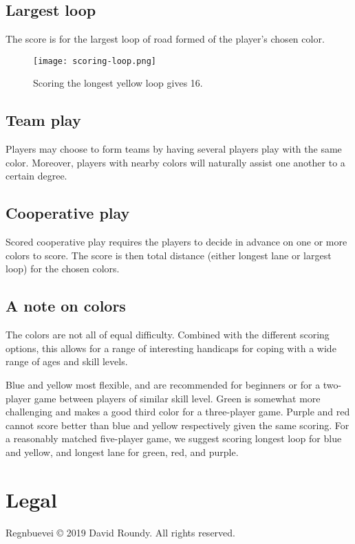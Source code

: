 \documentclass[twocolumn, 11pt]{article}
\begin{document}
\subsection*{Largest loop}
The score is for the largest loop of road formed of the player’s
chosen color.

\begin{figure}[h]
  \texttt{[image: scoring-loop.png]}
  \caption{Scoring the longest yellow loop gives 16.}
\end{figure}

\subsection*{Team play}
Players may choose to form teams by having several players play with
the same color.  Moreover, players with nearby colors will naturally
assist one another to a certain degree.
\subsection*{Cooperative play}
Scored cooperative play requires the players to decide in advance on
one or more colors to score.  The score is then total distance (either
longest lane or largest loop) for the chosen colors.

\subsection*{A note on colors}
The colors are not all of equal difficulty.  Combined with the
different scoring options, this allows for a range of interesting
handicaps for coping with a wide range of ages and skill levels.

Blue and yellow most flexible, and are recommended for
beginners or for a two-player game between players of similar skill
level.  Green is somewhat more challenging and makes a good third
color for a three-player game.  Purple and red cannot score better
than blue and yellow respectively given the same scoring.  For a
reasonably matched five-player game, we suggest scoring longest loop
for blue and yellow, and longest lane for green, red, and purple.

\section{Legal}
Regnbuevei © 2019 David Roundy. All rights reserved.
\end{document}
